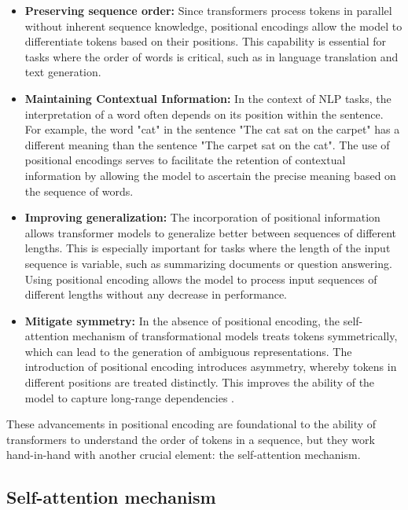 \begin{itemize}
    \item \textbf{Preserving sequence order:} Since transformers process tokens in parallel without inherent sequence knowledge, positional encodings allow the model to differentiate tokens based on their positions. This capability is essential for tasks where the order of words is critical, such as in language translation and text generation.
    
    \item \textbf{Maintaining Contextual Information:} In the context of NLP tasks, the interpretation of a word often depends on its position within the sentence. For example, the word "cat" in the sentence "The cat sat on the carpet" has a different meaning than the sentence "The carpet sat on the cat". The use of positional encodings serves to facilitate the retention of contextual information by allowing the model to ascertain the precise meaning based on the sequence of words.
    
    \item \textbf{Improving generalization:} The incorporation of positional information allows transformer models to generalize better between sequences of different lengths. This is especially important for tasks where the length of the input sequence is variable, such as summarizing documents or question answering. Using positional encoding allows the model to process input sequences of different lengths without any decrease in performance.
    
    \item \textbf{Mitigate symmetry:} In the absence of positional encoding, the self-attention mechanism of transformational models treats tokens symmetrically, which can lead to the generation of ambiguous representations. The introduction of positional encoding introduces asymmetry, whereby tokens in different positions are treated distinctly. This improves the ability of the model to capture long-range dependencies \cite{geeksforgeeks2024-pe}.
\end{itemize}

These advancements in positional encoding are foundational to the ability of transformers to understand the order of tokens in a sequence, but they work hand-in-hand with another crucial element: the self-attention mechanism.

\subsection{Self-attention mechanism}


